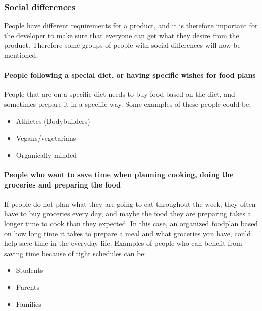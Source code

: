 \subsubsection{Social differences}

People have different requirements for a product, and it is therefore important for the developer to make sure that everyone can get what they desire from the product. Therefore some groups of people with social differences will now be mentioned.

\paragraph{People following a special diet, or having specific wishes for food plans}
People that are on a specific diet needs to buy food based on the diet, and sometimes prepare it in a specific way.
Some examples of these people could be:
\begin{itemize}
\item Athletes (Bodybuilders)
\item Vegans/vegetarians
\item Organically minded
\end{itemize}

\paragraph{People who want to save time when planning cooking, doing the groceries and preparing the food} 
If people do not plan what they are going to eat throughout the week, they often have to buy groceries every day, and maybe the food they are preparing takes a longer time to cook than they expected. In this case, an organized foodplan based on how long time it takes to prepare a meal and what groceries you have, could help save time in the everyday life. Examples of people who can benefit from saving time because of tight schedules can be:
\begin{itemize}
\item Students
\item Parents
\item Families
\end{itemize}

